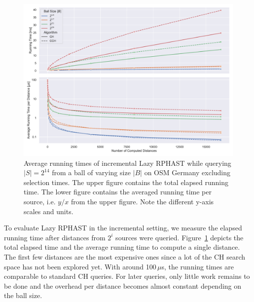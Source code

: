 \documentclass[manuscript,review]{acmart}
\begin{document}
\begin{figure}
\centering
\includegraphics[width=\linewidth]{fig/lazy_rphast_inc.pdf}
\caption{
Average running times of incremental Lazy RPHAST while querying $|S| = 2^{14}$ from a ball of varying size $|B|$ on OSM Germany excluding selection times.
The upper figure contains the total elapsed running time.
The lower figure contains the averaged running time per source, i.e. $y/x$ from the upper figure.
Note the different y-axis scales and units.
}\label{fig:lazy_rphast_inc}
\end{figure}

To evaluate Lazy RPHAST in the incremental setting, we measure the elapsed running time after distances from $2^i$ sources were queried.
Figure~\ref{fig:lazy_rphast_inc} depicts the total elapsed time and the average running time to compute a single distance.
The first few distances are the most expensive ones since a lot of the CH search space has not been explored yet.
With around 100\,$\mu$s, the running times are comparable to standard CH queries.
For later queries, only little work remains to be done and the overhead per distance becomes almost constant depending on the ball size.
\end{document}
